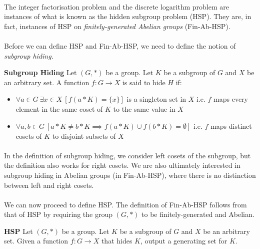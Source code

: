 \paragraph{}
The integer factorisation problem and the discrete logarithm problem are instances of what is known as the hidden subgroup problem (HSP). They are, in fact, instances of HSP on \textit{finitely-generated Abelian groups} (Fin-Ab-HSP).

\paragraph{}
Before we can define HSP and Fin-Ab-HSP, we need to define the notion of \textit{subgroup hiding}.

\theoremstyle{definition}
\begin{definition}{\textbf{Subgroup Hiding}}
Let $(G, *)$ be a group. Let $K$ be a subgroup of $G$ and $X$ be an arbitrary set. A function $f: G \rightarrow X$ is said to hide $H$ if:
\begin{itemize}
    \item $\forall a \in G \: \exists x \in X \: [ f(a*K) = \{x\}]$ is a singleton set in $X$ i.e. $f$ maps every element in the same coset of $K$ to the same value in $X$
    \item $\forall a,b \in G \: [a*K \not= b*K \implies f(a*K) \cup f(b*K) = \emptyset]$ i.e. $f$ maps distinct cosets of $K$ to disjoint subsets of $X$
\end{itemize}
\end{definition}

\paragraph{}
In the definition of subgroup hiding, we consider left cosets of the subgroup, but the definition also works for right cosets. We are also ultimately interested in subgroup hiding in Abelian groups (in Fin-Ab-HSP), where there is no distinction between left and right cosets.

\paragraph{}
We can now proceed to define HSP. The definition of Fin-Ab-HSP follows from that of HSP by requiring the group $(G, *)$ to be finitely-generated and Abelian.

\theoremstyle{definition}
\begin{definition}{\textbf{HSP}}
Let $(G, *)$ be a group. Let $K$ be a subgroup of $G$ and $X$ be an arbitrary set. Given a function $f: G \rightarrow X$ that hides $K$, output a generating set for $K$.
\end{definition}

